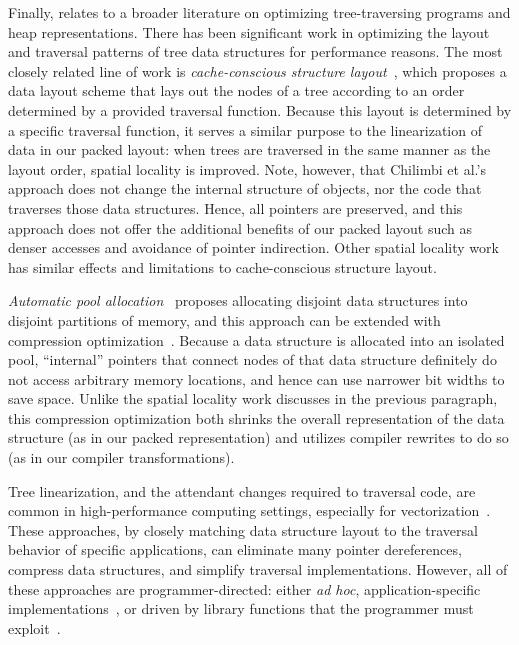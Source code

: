 \documentclass[showabstract,showacknowledgments,showpreface,showdedication]{iuphd}
\theoremstyle{nonumberplain}
\begin{document}
Finally, \ourcalc relates to a broader literature on optimizing
tree-traversing programs and heap representations.
%
There has been significant work in optimizing the layout and
traversal patterns of tree data structures for performance reasons.
%
The most closely related line of work is \emph{cache-conscious structure
  layout}~\cite{chilimbi1999}, which proposes a data layout scheme that lays out
the nodes of a tree according to an order determined by a provided traversal
function. Because this layout is determined by a specific traversal function,
it serves a similar purpose to the linearization of data in our packed layout:
when trees are traversed in the same manner as the layout order, spatial
locality is improved. Note, however, that Chilimbi et al.'s approach does not
change the internal structure of objects, nor the code that traverses those
data structures. Hence, all pointers are preserved, and this approach does not
offer the additional benefits of our packed layout such as denser accesses and
avoidance of pointer indirection. Other spatial locality
work~\cite{Truong1998,Lattner2005,Chilimbi1999a} has similar effects and
limitations to cache-conscious structure layout.

\emph{Automatic pool allocation}~\cite{Lattner2005} proposes
allocating disjoint data structures into disjoint partitions of
memory, and this approach can be extended with compression
optimization~\cite{Lattner2005mspc}. Because a data structure is
allocated into an isolated pool, ``internal'' pointers that connect
nodes of that data structure definitely do not access arbitrary memory
locations, and hence can use narrower bit widths to save space. Unlike
the spatial locality work discusses in the previous paragraph, this
compression optimization both shrinks the overall representation of
the data structure (as in our packed representation) and utilizes
compiler rewrites to do so (as in our compiler transformations).

Tree linearization, and the attendant changes required to traversal code, are
common in high-performance computing settings, especially for
vectorization~\cite{makino90,goldfarb13sc,Meyerovich2011,ren13cgo,ren14taco}.
These approaches, by closely matching data structure layout to the traversal
behavior of specific applications, can eliminate many pointer dereferences,
compress data structures, and simplify traversal implementations. However, all
of these approaches are programmer-directed: either \emph{ad hoc},
application-specific
implementations~\cite{makino90,goldfarb13sc,Meyerovich2011}, or driven by
library functions that the programmer must exploit~\cite{ren13cgo,ren14taco}.
\end{document}
